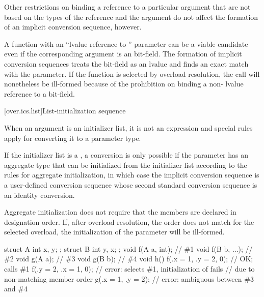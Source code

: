 \pnum
Other restrictions on binding a reference to a particular argument
that are not based on the types of the reference and the argument
do not affect the formation of an implicit conversion
sequence, however.
\begin{example}
A function with an ``lvalue reference to '' parameter can
be a viable candidate even if the corresponding argument is an
bit-field.
The formation of implicit conversion sequences
treats the
bit-field as an
lvalue and finds an exact
match with the parameter.
If the function is selected by overload
resolution, the call will nonetheless be ill-formed because of
the prohibition on binding a non- lvalue reference to a bit-field.
\end{example}

[over.ics.list]{List-initialization sequence}

\pnum
When an argument is an initializer list, it is not an
expression and special rules apply for converting it to a parameter type.

\pnum
If the initializer list is a ,
a conversion is only possible if
the parameter has an aggregate type
that can be initialized from the initializer list
according to the rules for aggregate initialization,
in which case the implicit conversion sequence is
a user-defined conversion sequence
whose second standard conversion sequence
is an identity conversion.
\begin{note}
Aggregate initialization does not require that
the members are declared in designation order.
If, after overload resolution, the order does not match
for the selected overload,
the initialization of the parameter will be ill-formed.
\begin{example}
\begin{codeblock}
struct A { int x, y; };
struct B { int y, x; };
void f(A a, int);               // \#1
void f(B b, ...);               // \#2
void g(A a);                    // \#3
void g(B b);                    // \#4
void h() {
  f({.x = 1, .y = 2}, 0);       // OK; calls \#1
  f({.y = 2, .x = 1}, 0);       // error: selects \#1, initialization of  fails
                                // due to non-matching member order
  g({.x = 1, .y = 2});          // error: ambiguous between \#3 and \#4
}
\end{codeblock}
\end{example}
\end{note}

